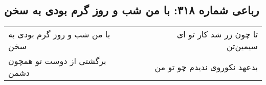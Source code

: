 \begin{center}
\section*{رباعی شماره ۳۱۸: با من شب و روز گرم بودی به سخن}
\label{sec:sh318}
\begin{longtable}{l p{0.5cm} r}
با من شب و روز گرم بودی به سخن
&&
تا چون زر شد کار تو ای سیمین‌تن
\\
برگشتی از دوست تو همچون دشمن
&&
بدعهد نکوروی ندیدم چو تو من
\\
\end{longtable}
\end{center}
